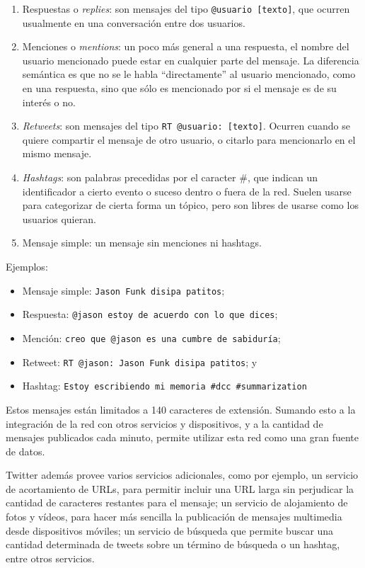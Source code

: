 \documentclass[upright, contnum]{umemoria}
\begin{document}
\begin{enumerate}
\item Respuestas o \emph{replies}: son mensajes del tipo \texttt{@usuario [texto]},
      que ocurren usualmente en una conversación entre dos usuarios.
\item Menciones o \emph{mentions}: un poco más general a una respuesta, el
      nombre del usuario mencionado puede estar en cualquier parte del
      mensaje. La diferencia semántica es que no se le habla
      ``directamente'' al usuario mencionado, como en una respuesta, sino
      que sólo es mencionado por si el mensaje es de su interés o no.
\item \emph{Retweets}: son mensajes del tipo \texttt{RT @usuario: [texto]}. Ocurren
      cuando se quiere compartir el mensaje de otro usuario, o citarlo
      para mencionarlo en el mismo mensaje.
\item \emph{Hashtags}: son palabras precedidas por el caracter \#, que indican
      un identificador a cierto evento o suceso dentro o fuera de la
      red. Suelen usarse para categorizar de cierta forma un tópico, pero
      son libres de usarse como los usuarios quieran.
\item Mensaje simple: un mensaje sin menciones ni hashtags.
\end{enumerate}
  Ejemplos:

\begin{itemize}
\item Mensaje simple: \texttt{Jason Funk disipa patitos};
\item Respuesta: \texttt{@jason estoy de acuerdo con lo que dices};
\item Mención: \texttt{creo que @jason es una cumbre de sabiduría};
\item Retweet: \texttt{RT @jason: Jason Funk disipa patitos}; y
\item Hashtag: \texttt{Estoy escribiendo mi memoria \#dcc \#summarization}
\end{itemize}
  Estos mensajes están limitados a 140 caracteres de extensión. Sumando
  esto a la integración de la red con otros servicios y dispositivos, y
  a la cantidad de mensajes publicados cada minuto, permite utilizar
  esta red como una gran fuente de datos.

  Twitter además provee varios servicios adicionales, como por ejemplo,
  un servicio de acortamiento de URLs, para permitir incluir una URL
  larga sin perjudicar la cantidad de caracteres restantes para el
  mensaje; un servicio de alojamiento de fotos y vídeos, para hacer más
  sencilla la publicación de mensajes multimedia desde dispositivos
  móviles; un servicio de búsqueda que permite buscar una cantidad
  determinada de tweets sobre un término de búsqueda o un hashtag,
  entre otros servicios.
\end{document}
